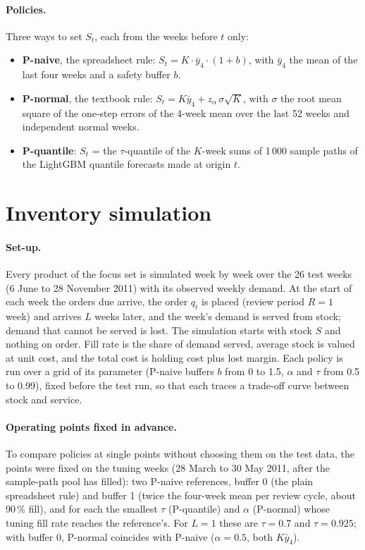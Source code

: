 \documentclass[11pt,a4paper]{article}
\begin{document}
\paragraph{Policies.} Three ways to set $S_t$, each from the weeks before $t$ only:
\begin{itemize}
  \item \textbf{P-naive}, the spreadsheet rule: $S_t = K \cdot \bar y_4 \cdot (1 + b)$, with
    $\bar y_4$ the mean of the last four weeks and a safety buffer $b$.
  \item \textbf{P-normal}, the textbook rule: $S_t = K \bar y_4 + z_\alpha\,\sigma \sqrt{K}$,
    with $\sigma$ the root mean square of the one-step errors of the 4-week mean over the last
    52 weeks and independent normal weeks.
  \item \textbf{P-quantile}: $S_t$ = the $\tau$-quantile of the $K$-week sums of 1\,000 sample
    paths of the LightGBM quantile forecasts made at origin $t$.
\end{itemize}

\section{Inventory simulation}
\label{sec:simulation}

\paragraph{Set-up.} Every product of the focus set is simulated week by week over the 26 test
weeks (6 June to 28 November 2011) with its observed weekly demand. At the start of each week
the orders due arrive, the order $q_t$ is placed (review period $R = 1$ week) and arrives $L$
weeks later, and the week's demand is served from stock; demand that cannot be served is lost.
The simulation starts with stock $S$ and nothing on order. Fill rate is the share of demand
served, average stock is valued at unit cost, and the total cost is holding cost plus lost
margin. Each policy is run over a grid of its parameter (P-naive buffers $b$ from 0 to 1.5,
$\alpha$ and $\tau$ from 0.5 to 0.99), fixed before the test run, so that each traces a
trade-off curve between stock and service.

\paragraph{Operating points fixed in advance.} To compare policies at single points without
choosing them on the test data, the points were fixed on the tuning weeks (28 March to
30 May 2011, after the sample-path pool has filled): two P-naive references, buffer 0 (the
plain spreadsheet rule) and buffer 1 (twice the four-week mean per review cycle, about 90\,\%
fill), and for each the smallest $\tau$ (P-quantile) and $\alpha$ (P-normal) whose tuning
fill rate reaches the reference's. For $L = 1$ these are $\tau = 0.7$ and $\tau = 0.925$; with
buffer 0, P-normal coincides with P-naive ($\alpha = 0.5$, both $K \bar y_4$).
\end{document}
